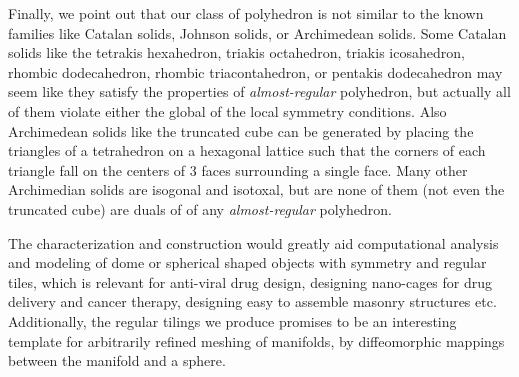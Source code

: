 \documentclass[11pt]{article}
\newcommand{\1}{\mathds{1}}
\begin{document}
Finally, we point out that our class of polyhedron is not similar to the known families like Catalan solids, Johnson solids, or Archimedean solids. Some Catalan solids like the tetrakis hexahedron, triakis octahedron, triakis icosahedron, rhombic dodecahedron, rhombic triacontahedron, or pentakis dodecahedron may seem like they satisfy the properties of \emph{almost-regular} polyhedron, but actually all of them violate either the global of the local symmetry conditions. Also Archimedean solids like the truncated cube can be generated by placing the triangles of a tetrahedron on a hexagonal lattice such that the corners of each triangle fall on the centers of 3 faces surrounding a single face. Many other Archimedian solids are isogonal and isotoxal, but are none of them (not even the truncated cube) are duals of of any \emph{almost-regular} polyhedron.

The characterization and construction would greatly aid computational analysis and modeling of dome or spherical shaped objects with symmetry and regular tiles, which is relevant for anti-viral drug design, designing nano-cages for drug delivery and cancer therapy, designing easy to assemble masonry structures etc. Additionally, the regular tilings we produce promises to be an interesting template for arbitrarily refined meshing of manifolds, by diffeomorphic mappings between the manifold and a sphere.
\end{document}
